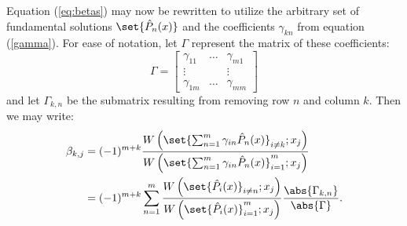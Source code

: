 \documentclass{article}
\begin{document}
Equation (\ref{eq:betas}) may now be rewritten to utilize the arbitrary set of fundamental solutions $\set{\hat{P}_n(x)}$ and the coefficients $\gamma_{kn}$ from equation (\ref{gamma}).
For ease of notation, let $\Gamma$ represent the matrix of these coefficients:
\begin{equation*}
\Gamma = \begin{bmatrix} \gamma_{11} & \dots & \gamma_{m1} \\ \vdots & & \vdots \\ \gamma_{1m} & \dots & \gamma_{mm} \end{bmatrix}
\end{equation*}
and let $\Gamma_{k,n}$ be the submatrix resulting from removing row $n$ and column $k$.
Then we may write:
\begin{equation*}
\begin{split}
\beta_{k,j} & = (-1)^{m+k} \frac{\W{\set{\sum_{n=1}^m \gamma_{in} \hat{P}_n(x)}_{i \neq k}}{x_j}}{\W{\set{\sum_{n=1}^m \gamma_{in} \hat{P}_n(x)}_{i=1}^m}{x_j}} \\
			& = (-1)^{m+k} \sum_{n=1}^m \frac{\W{\set{\hat{P}_i(x)}_{i \neq n}}{x_j}}{\W{\set{\hat{P}_i(x)}_{i=1}^m}{x_j}} \frac{\abs{\Gamma_{k,n}}}{\abs{\Gamma}} .
\end{split}
\end{equation*}
\end{document}
